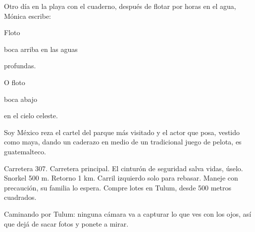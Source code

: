\documentclass[12pt,twoside,openright,a5paper]{book}
\begin{document}
\vspace{0.5cm}
\hrulefill\hspace{0.2cm} \decofourleft\decofourright \hspace{0.2cm} \hrulefill
\vspace{0.5cm}

Otro día en la playa con el cuaderno, después de
flotar por horas en el agua, Mónica escribe: 

\vspace{0.5cm}

Floto

boca arriba en las aguas

profundas.

O floto 

boca abajo

en el cielo celeste.


\vspace{0.5cm}
\hrulefill\hspace{0.2cm} \decofourleft\decofourright \hspace{0.2cm} \hrulefill
\vspace{0.5cm}

Soy México reza el cartel del parque más visitado y el actor que posa,
vestido como maya, dando un caderazo en medio de un tradicional juego de
pelota, es guatemalteco.


\vspace{0.5cm}
\hrulefill\hspace{0.2cm} \decofourleft\decofourright \hspace{0.2cm} \hrulefill
\vspace{0.5cm}

Carretera 307. Carretera principal. El cinturón de seguridad salva
vidas, úselo. Snorkel 500  m. Retorno 1 km. Carril izquierdo solo para
rebasar. Maneje con precaución, su familia lo espera. Compre lotes en Tulum,
desde 500 metros cuadrados.


\vspace{0.5cm}
\hrulefill\hspace{0.2cm} \decofourleft\decofourright \hspace{0.2cm} \hrulefill
\vspace{0.5cm}

Caminando por Tulum: ninguna cámara va a capturar lo que ves con los ojos,
así que dejá de sacar fotos y ponete a mirar.


\vspace{0.5cm}
\hrulefill\hspace{0.2cm} \decofourleft\decofourright \hspace{0.2cm} \hrulefill
\vspace{0.5cm}
\end{document}
